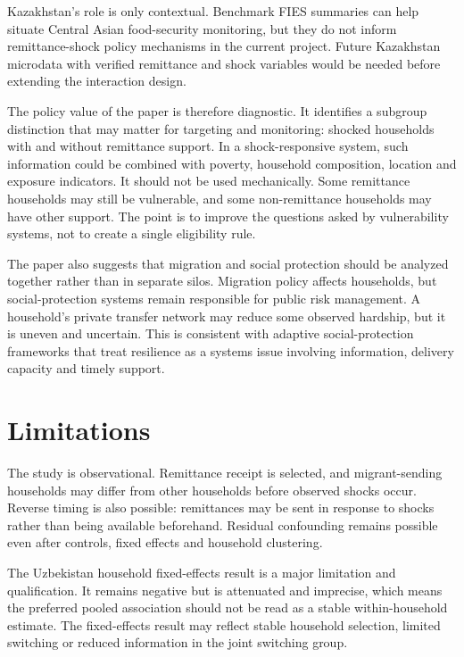 \documentclass[11pt]{article}
\begin{document}
Kazakhstan's role is only contextual. Benchmark FIES summaries can help situate Central Asian food-security monitoring, but they do not inform remittance-shock policy mechanisms in the current project. Future Kazakhstan microdata with verified remittance and shock variables would be needed before extending the interaction design.

The policy value of the paper is therefore diagnostic. It identifies a subgroup distinction that may matter for targeting and monitoring: shocked households with and without remittance support. In a shock-responsive system, such information could be combined with poverty, household composition, location and exposure indicators. It should not be used mechanically. Some remittance households may still be vulnerable, and some non-remittance households may have other support. The point is to improve the questions asked by vulnerability systems, not to create a single eligibility rule.

The paper also suggests that migration and social protection should be analyzed together rather than in separate silos. Migration policy affects households, but social-protection systems remain responsible for public risk management. A household's private transfer network may reduce some observed hardship, but it is uneven and uncertain. This is consistent with adaptive social-protection frameworks that treat resilience as a systems issue involving information, delivery capacity and timely support.

\section{Limitations}

The study is observational. Remittance receipt is selected, and migrant-sending households may differ from other households before observed shocks occur. Reverse timing is also possible: remittances may be sent in response to shocks rather than being available beforehand. Residual confounding remains possible even after controls, fixed effects and household clustering.

The Uzbekistan household fixed-effects result is a major limitation and qualification. It remains negative but is attenuated and imprecise, which means the preferred pooled association should not be read as a stable within-household estimate. The fixed-effects result may reflect stable household selection, limited switching or reduced information in the joint switching group.
\end{document}
